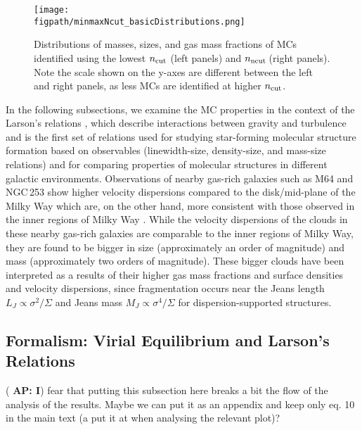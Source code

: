 \documentclass[iop]{emulateapj}
\newcommand{\AP}[1]{({\bf \color{apcolor} AP: #1})}
\begin{document}
\begin{figure*}[htbp]
\centering
\texttt{[image: \\figpath/minmaxNcut\_basicDistributions.png]}
\caption{
Distributions of masses, sizes, and gas mass fractions of MCs identified using 
the lowest $n_{\rm cut}$ (left panels) and $n_{\rm ncut}$\,\cc (right panels).
Note the scale shown on the y-axes are different between the left and right panels, as less MCs are identified 
at higher $n_{\rm cut}$.
\label{fig:dist}}
\end{figure*}

In the following subsections,
we examine the MC properties in the context of the Larson's relations \citep{Larson81a}, which
describe interactions between gravity and turbulence and is the first set of 
relations used for studying star-forming molecular structure formation based on observables (linewidth-size,
density-size, and mass-size relations) and for comparing properties of molecular structures
in different galactic environments.
Observations of nearby gas-rich galaxies such as M64 and NGC\,253
show higher velocity dispersions compared
to the disk/mid-plane of the Milky Way which are, on the other hand,
more consistent with those observed in the inner regions of
Milky Way \citep{Oka01a, Rosolowsky05a, Heyer09a, Leroy15a}.  %
While the velocity dispersions of the clouds in these nearby gas-rich galaxies are comparable
to the inner regions of Milky Way, they are found to be bigger in size (approximately
an order of magnitude) and mass (approximately two orders of magnitude).
These bigger clouds have been interpreted as a results of their higher gas mass fractions and
surface densities and velocity dispersions, since
fragmentation occurs near the Jeans length $L_J\propto\sigma^2/\Sigma$
and Jeans mass $M_J\propto\sigma^4/\Sigma$
for dispersion-supported structures.

\subsection{Formalism: Virial Equilibrium and Larson's Relations}  \label{sec:PVE}
{\AP I fear that putting this subsection here breaks a bit the flow of the analysis of the results. Maybe we can put it as an appendix and keep only eq. 10 in the main text (a put it at when analysing the relevant plot)? }
\end{document}
